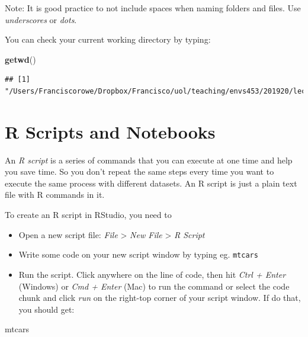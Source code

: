 \documentclass[]{book}
\newenvironment{Shaded}{\begin{snugshade}}{\end{snugshade}}
\newcommand{\KeywordTok}[1]{\textcolor[rgb]{0.13,0.29,0.53}{\textbf{#1}}}
\newcommand{\NormalTok}[1]{#1}
\begin{document}
Note: It is good practice to not include spaces when naming folders and
files. Use \emph{underscores} or \emph{dots}.

You can check your current working directory by typing:

\begin{Shaded}
\begin{Highlighting}[]
\KeywordTok{getwd}\NormalTok{()}
\end{Highlighting}
\end{Shaded}

\begin{verbatim}
## [1] "/Users/Franciscorowe/Dropbox/Francisco/uol/teaching/envs453/201920/lectures/san"
\end{verbatim}

\section{R Scripts and Notebooks}\label{r-scripts-and-notebooks}

An \emph{R script} is a series of commands that you can execute at one
time and help you save time. So you don't repeat the same steps every
time you want to execute the same process with different datasets. An R
script is just a plain text file with R commands in it.

To create an R script in RStudio, you need to

\begin{itemize}
\item
  Open a new script file: \emph{File} \textgreater{} \emph{New File}
  \textgreater{} \emph{R Script}
\item
  Write some code on your new script window by typing eg.
  \texttt{mtcars}
\item
  Run the script. Click anywhere on the line of code, then hit
  \emph{Ctrl + Enter} (Windows) or \emph{Cmd + Enter} (Mac) to run the
  command or select the code chunk and click \emph{run} on the right-top
  corner of your script window. If do that, you should get:
\end{itemize}

\begin{Shaded}
\begin{Highlighting}[]
\NormalTok{mtcars}
\end{Highlighting}
\end{Shaded}
\end{document}
